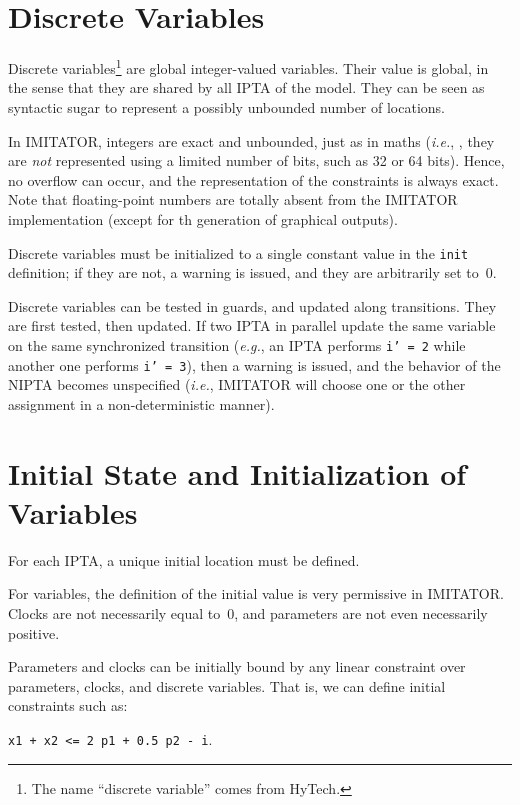 \documentclass[a4paper,11pt]{report}
\newcommand{\hytech}{{\sc HyTech}}
\newcommand{\imitator}{\textsf{IMITATOR}}
\newcommand{\IPTA}{IPTA}
\newcommand{\NIPTA}{NIPTA}
\newcommand{\styleIMI}[1]{\textcolor{imicolor}{\texttt{#1}}}
\newcommand{\eg}{\textcolor{colorok}{\textit{e.g.}, }}
\newcommand{\ie}{\textcolor{colorok}{\textit{i.e.}, }}
\begin{document}
\section{Discrete Variables}

Discrete variables\footnote{%
	The name ``discrete variable'' comes from \hytech{}.
}
are global integer-valued variables.
Their value is global, in the sense that they are shared by all \IPTA{} of the model.
They can be seen as syntactic sugar to represent a possibly unbounded number of locations.

In \imitator{}, integers are exact and unbounded, just as in maths (\ie{}, they are \emph{not} represented using a limited number of bits, such as 32 or 64 bits).
Hence, no overflow can occur, and the representation of the constraints is always exact.
Note that floating-point numbers are totally absent from the \imitator{} implementation (except for th generation of graphical outputs).

Discrete variables must be initialized to a single constant value in the \styleIMI{init} definition;
if they are not, a warning is issued, and they are arbitrarily set to~0.

Discrete variables can be tested in guards, and updated along transitions.
They are first tested, then updated.
If two \IPTA{} in parallel update the same variable on the same synchronized transition (\eg{} an \IPTA{} performs \styleIMI{i' = 2} while another one performs \styleIMI{i' = 3}), then a warning is issued, and the behavior of the \NIPTA{} becomes unspecified (\ie{} \imitator{} will choose one or the other assignment in a non-deterministic manner).



\section{Initial State and Initialization of Variables}\label{ss:init}

For each \IPTA{}, a unique initial location must be defined.

For variables, the definition of the initial value is very permissive in \imitator{}.
Clocks are not necessarily equal to~0, and parameters are not even necessarily positive.

Parameters and clocks can be initially bound by any linear constraint over parameters, clocks, and discrete variables.
That is, we can define initial constraints such as:
\begin{center}
	\styleIMI{x1 + x2 <= 2 p1 + 0.5 p2 - i}.
\end{center}
\end{document}
